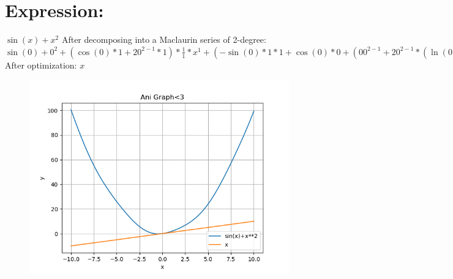 \documentclass{article}
\begin{document}
\section{Expression:}
$\sin(x)+{x}^{2}$\newline\newline
After decomposing into a Maclaurin series of 2-degree:\newline
$\sin(0)+{0}^{2}+(\cos(0)*1+2{0}^{2-1}*1)*\frac{1}{1}*{x}^{1}+(-\sin(0)*1*1+\cos(0)*0+(0{0}^{2-1}+2{0}^{2-1}*(\ln(0)*(0-0)+\frac{1}{0}*1*(2-1)))*1+2{0}^{2-1}*0)*\frac{1}{2}*{x}^{2}$\newline\newline
After optimization:\newline
$x$\newline\newline
\begin{figure} [!ht]
\begin{flushleft}
\includegraphics[scale = 0.700000]{figs/fig3.png}
\end{flushleft}
\end{figure}
\newpage
\end{document}
